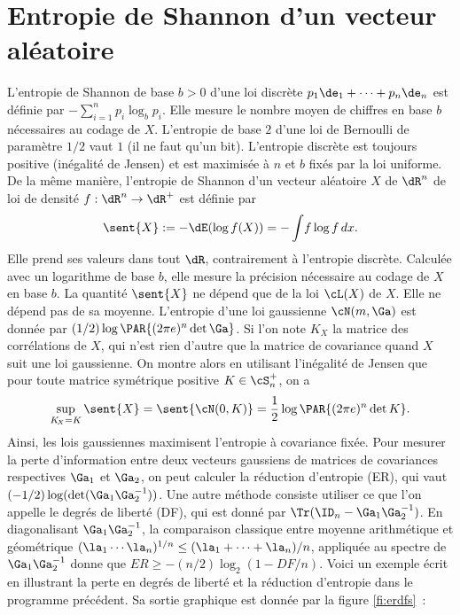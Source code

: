 {{\section{Entropie de Shannon d'un vecteur aléatoire}
%
L'entropie de Shannon de base $b>0$ d'une loi discrète $p_1\de_1+\cdots+
p_n\de_n$ est définie par $-\sum_{i=1}^n p_i\log_b p_i$.  Elle mesure le
nombre moyen de chiffres en base $b$ nécessaires au codage de $X$. L'entropie
de base $2$ d'une loi de Bernoulli de paramètre $1/2$ vaut $1$ (il ne faut
qu'un bit). L'entropie discrète est toujours positive (inégalité de Jensen) et
est maximisée à $n$ et $b$ fixés par la loi uniforme.  De la même manière,
l'entropie de Shannon d'un vecteur aléatoire $X$ de $\dR^n$ de loi de densité
$f:\dR^n\to\dR^+$ est définie par
$$
\sent{X}:=-\dE(\log f(X))=-\int\!f\log f\,dx.
$$
Elle prend ses valeurs dans tout $\dR$, contrairement à l'entropie
discrète.  Calculée avec un logarithme de base $b$, elle mesure la précision
nécessaire au codage de $X$ en base $b$. La quantité $\sent{X}$ ne dépend que
de la loi $\cL(X)$ de $X$. Elle ne dépend pas de sa moyenne. L'entropie d'une
loi gaussienne $\cN(m,\Ga)$ est donnée par $(1/2) \log \PAR{(2\pi e)^n\det
  \Ga}$.  Si l'on note $K_{\!X}$ la matrice des corrélations de $X$, qui n'est
rien d'autre que la matrice de covariance quand $X$ suit une loi gaussienne.
On montre alors en utilisant l'inégalité de Jensen que pour toute matrice
symétrique positive $K\in\cS_n^+$, on a
$$
\sup_{K_{\!X}=K}\sent{X} = \sent{\cN(0,K)} = \frac{1}{2} \log \PAR{(2\pi
  e)^n\det K}.
$$
Ainsi, les lois gaussiennes maximisent l'entropie à covariance fixée. Pour
mesurer la perte d'information entre deux vecteurs gaussiens de matrices de
covariances respectives $\Ga_1$ et $\Ga_2$, on peut calculer la réduction
d'entropie (ER), qui vaut $(-1/2)\log(\det(\Ga_1\Ga_2^{-1}))$. Une autre
méthode consiste utiliser ce que l'on appelle le degrés de liberté (DF), qui
est donné par $\Tr(\ID_n-\Ga_1\Ga_2^{-1})$. En diagonalisant
$\Ga_1\Ga_2^{-1}$, la comparaison classique entre moyenne arithmétique et
géométrique $(\la_1\cdots\la_n)^{1/n} \leq (\la_1+\cdots+\la_n)/n$, appliquée au spectre de
$\Ga_1\Ga_2^{-1}$ donne que $ER\geq -(n/2)\log_2(1-DF/n)$. Voici un exemple écrit
en \ML{} illustrant la perte en degrés de liberté et la réduction d'entropie
dans le programme précédent. Sa sortie graphique est donnée par la figure
\ref{fi:erdfs}~:
%
%
%
%

}}
